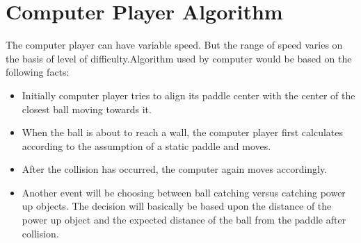 \documentclass{article}
\begin{document}
			

			\section{Computer Player Algorithm}
			\par\noindent The computer player can have variable speed. But the range of speed varies on the basis of level of difficulty.Algorithm used by computer would be based on the following facts:

			\begin{itemize}
			\item Initially computer player tries to align its paddle center with the center of the closest ball moving towards it.
			\item When the ball is about to reach a wall, the computer player first calculates according to the assumption of a static paddle and moves.
			\item After the collision has occurred, the computer again moves accordingly.
			\item Another event will be choosing between ball catching versus catching power up objects. The decision will basically be based upon the distance of the power up object and the expected distance of the ball from the paddle after collision.
			\end{itemize}
\end{document}
